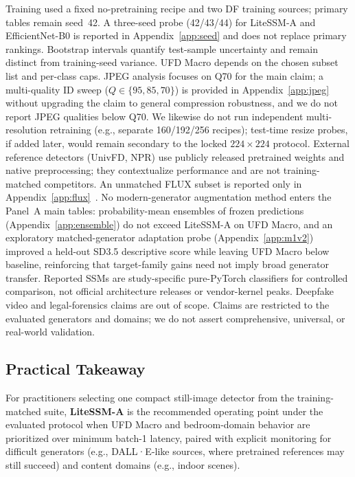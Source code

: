 Training used a fixed no-pretraining recipe and two DF training sources; primary tables remain seed~42.
A three-seed probe (42/43/44) for LiteSSM-A and EfficientNet-B0 is reported in Appendix~\ref{app:seed} and does not replace primary rankings.
Bootstrap intervals quantify test-sample uncertainty and remain distinct from training-seed variance.
UFD Macro depends on the chosen subset list and per-class caps.
JPEG analysis focuses on Q70 for the main claim; a multi-quality ID sweep ($Q\in\{95,85,70\}$) is provided in Appendix~\ref{app:jpeg} without upgrading the claim to general compression robustness, and we do not report JPEG qualities below Q70.
We likewise do not run independent multi-resolution retraining (e.g., separate 160/192/256 recipes); test-time resize probes, if added later, would remain secondary to the locked $224\times224$ protocol.
External reference detectors (UnivFD, NPR) use publicly released pretrained weights and native preprocessing; they contextualize performance and are not training-matched competitors.
An unmatched FLUX subset is reported only in Appendix~\ref{app:flux}~\cite{flux2024}.
No modern-generator augmentation method enters the Panel~A main tables: probability-mean ensembles of frozen predictions (Appendix~\ref{app:ensemble}) do not exceed LiteSSM-A on UFD Macro, and an exploratory matched-generator adaptation probe (Appendix~\ref{app:m1v2}) improved a held-out SD3.5 descriptive score while leaving UFD Macro below baseline, reinforcing that target-family gains need not imply broad generator transfer.
Reported SSMs are study-specific pure-PyTorch classifiers for controlled comparison, not official architecture releases or vendor-kernel peaks.
Deepfake video and legal-forensics claims are out of scope.
Claims are restricted to the evaluated generators and domains; we do not assert comprehensive, universal, or real-world validation.

\subsection{Practical Takeaway}

For practitioners selecting one compact still-image detector from the training-matched suite, \textbf{LiteSSM-A} is the recommended operating point under the evaluated protocol when UFD Macro and bedroom-domain behavior are prioritized over minimum batch-1 latency, paired with explicit monitoring for difficult generators (e.g., DALL·E-like sources, where pretrained references may still succeed) and content domains (e.g., indoor scenes).
